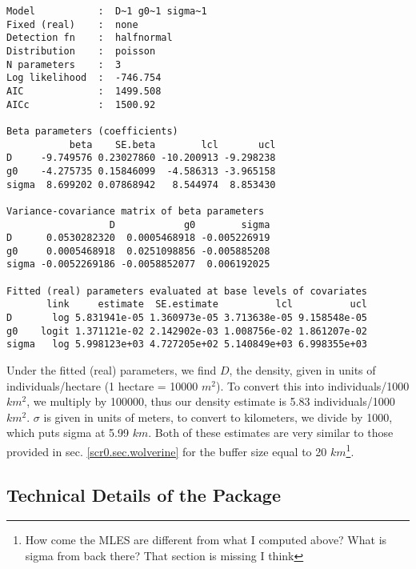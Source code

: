 {{\begin{verbatim}
Model           :  D~1 g0~1 sigma~1 
Fixed (real)    :  none 
Detection fn    :  halfnormal 
Distribution    :  poisson 
N parameters    :  3 
Log likelihood  :  -746.754 
AIC             :  1499.508 
AICc            :  1500.92 

Beta parameters (coefficients) 
           beta    SE.beta        lcl       ucl
D     -9.749576 0.23027860 -10.200913 -9.298238
g0    -4.275735 0.15846099  -4.586313 -3.965158
sigma  8.699202 0.07868942   8.544974  8.853430

Variance-covariance matrix of beta parameters 
                  D            g0        sigma
D      0.0530282320  0.0005468918 -0.005226919
g0     0.0005468918  0.0251098856 -0.005885208
sigma -0.0052269186 -0.0058852077  0.006192025

Fitted (real) parameters evaluated at base levels of covariates 
       link     estimate  SE.estimate          lcl          ucl
D       log 5.831941e-05 1.360973e-05 3.713638e-05 9.158548e-05
g0    logit 1.371121e-02 2.142902e-03 1.008756e-02 1.861207e-02
sigma   log 5.998123e+03 4.727205e+02 5.140849e+03 6.998355e+03
\end{verbatim}
}

Under the fitted (real) parameters, we find $D$, the density, given in
units of individuals/hectare (1 hectare = 10000 $m^2$).  To convert this
into individuals/1000 $km^2$, we multiply by 100000, thus our density
estimate is 5.83 individuals/1000 $km^2$.  $\sigma$ is given in units of
meters, to convert to kilometers, we divide by 1000, which puts sigma
at 5.99 $km$.  Both of these estimates are very similar to those
provided in sec. \ref{scr0.sec.wolverine} for the buffer size equal to
20 $km$\footnote{How come the MLES are different from what I computed
  above?  What is sigma from back there? That section is missing
  I think}.


\begin{comment}
As an
exercise, run this analysis for 30 and 40 km buffers and compare those
found in section 4.6 under {\bf WinBUGS}.  
NOTE: The function \mbox{\tt
  secr.fit} 
will return a
warning when the buffer size appears to be too small.  This is useful
particularly with the different units being used between programs and
packages.
\end{comment}

\subsection{Technical Details of the \secr Package}

}
